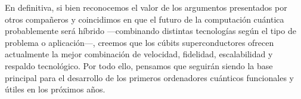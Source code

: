 \documentclass{article}
\begin{document}
En definitiva, si bien reconocemos el valor de los argumentos presentados por otros compañeros y coincidimos en que el futuro de la computación cuántica probablemente será híbrido —combinando distintas tecnologías según el tipo de problema o aplicación—, creemos que los cúbits superconductores ofrecen actualmente la mejor combinación de velocidad, fidelidad, escalabilidad y respaldo tecnológico. Por todo ello, pensamos que seguirán siendo la base principal para el desarrollo de los primeros ordenadores cuánticos funcionales y útiles en los próximos años.
\end{document}
